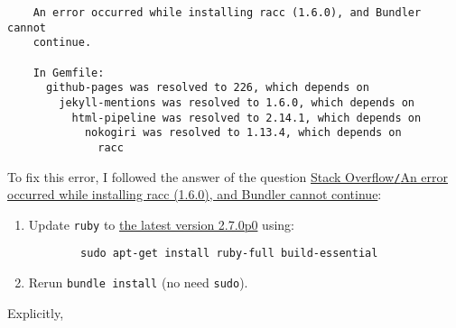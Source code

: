 \documentclass{article}
\numberwithin{equation}{section}
\begin{document}
\begin{verbatim}
	An error occurred while installing racc (1.6.0), and Bundler cannot
	continue.
	
	In Gemfile:
	  github-pages was resolved to 226, which depends on
	    jekyll-mentions was resolved to 1.6.0, which depends on
	      html-pipeline was resolved to 2.14.1, which depends on
	        nokogiri was resolved to 1.13.4, which depends on
	          racc
\end{verbatim}
To fix this error, I followed the answer of the question \href{https://stackoverflow.com/questions/70398847/an-error-occurred-while-installing-racc-1-6-0-and-bundler-cannot-continue}{Stack Overflow\texttt{/}An error occurred while installing racc (1.6.0), and Bundler cannot continue}:
\begin{enumerate}
	\item Update \texttt{ruby} to \href{https://www.ruby-lang.org/en/documentation/installation/}{the latest version 2.7.0p0} using:
	\begin{verbatim}
		sudo apt-get install ruby-full build-essential
	\end{verbatim}
	\item Rerun \texttt{bundle install} (no need \texttt{sudo}).
\end{enumerate}
Explicitly,
\end{document}
